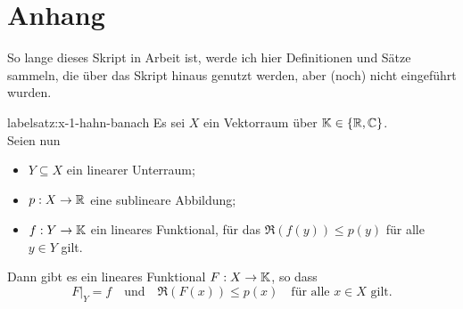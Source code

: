 

\chapter*{Anhang}  

So lange dieses Skript in Arbeit ist, werde ich hier Definitionen und Sätze sammeln, die über das Skript hinaus genutzt werden, aber (noch) nicht eingeführt wurden.


\begin{satznbfr}  label{satz:x-1-hahn-banach}
	Es sei $X$ ein Vektorraum über $\mathbb{K} \in \{ \mathbb{R}, \mathbb{C} \}$. \\
	Seien nun
	\begin{itemize}
		\item $Y \subseteq X$ ein linearer Unterraum;
		\item $p: X \rightarrow \mathbb{R}$ eine sublineare Abbildung;
		\item $f: Y \rightarrow \mathbb{K}$ ein lineares Funktional, für das $\Re(f(y)) \leq p(y)$ für alle $y \in Y$ gilt.
	\end{itemize}
	Dann gibt es ein lineares Funktional $F: X \rightarrow \mathbb{K}$, so dass
	\[ F|_{Y} = f \quad \text{und} \quad \Re(F(x)) \leq p(x) \quad \text{für alle } x \in X \text{ gilt.} \]
\end{satznbfr}



\newpage